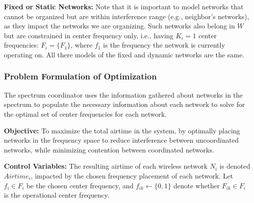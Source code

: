 
%

\textbf{Fixed or Static Networks:} Note that it is important to model networks that cannot be organized but are within interference range (e.g., neighbor's networks), as they impact the networks we are organizing.  Such networks also belong in $W$ but are constrained in center frequency only, i.e., having $K_i=1$ center frequencies: $F_i=\{F_1\}$, where $f_1$ is the frequency the network is currently operating on.  All there models of the fixed and dynamic networks are the same.

%

\subsubsection{Problem Formulation of Optimization}

The spectrum coordinator uses the information gathered about networks in the spectrum to populate the necessary information about each network to solve for the optimal set of center frequencies for each network.  

\smallskip
\noindent \textbf{Objective:} To maximize the total airtime in the system, by optimally placing networks in the frequency space to reduce interference between uncoordinated networks, while minimizing contention between coordinated networks.

\smallskip
\noindent \textbf{Control Variables:} The resulting airtime of each wireless network $N_i$ is denoted $Airtime_i$, impacted by the chosen frequency placement of each network.  Let $f_i \in F_i$ be the chosen center frequency, and $f_{ik} \leftarrow \{0,1\}$ denote whether $F_{ik} \in F_i$ is the operational center frequency.  

%
%

